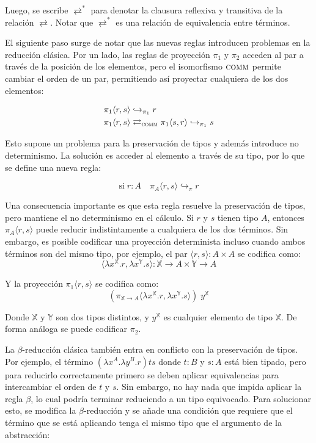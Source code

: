 Luego, se escribe $\rightleftarrows^*$ para denotar la clausura reflexiva y transitiva de la relación $\rightleftarrows$.
Notar que $\rightleftarrows^*$ es una relación de equivalencia entre términos.

El siguiente paso surge de notar que las nuevas reglas introducen problemas en la reducción clásica.
Por un lado, las reglas de proyección $\pi_1$ y $\pi_2$ acceden al par a través de la posición de los elementos, pero el isomorfismo $\textsc{comm}$ permite cambiar el orden de un par, permitiendo así proyectar cualquiera de los dos elementos:

\begin{align*}
	\pi_1 \langle r, s \rangle& \hookrightarrow_{\pi_1} r \\
	\pi_1 \langle r, s \rangle& \rightleftarrows_{\textsc{comm}} \pi_1 \langle s, r \rangle \hookrightarrow_{\pi_1} s
\end{align*}

Esto supone un problema para la preservación de tipos y además introduce no determinismo.
La solución es acceder al elemento a través de su tipo, por lo que se define una nueva regla:

\[ \text{si} \; r:A \quad \pi_A \langle r, s \rangle \hookrightarrow_{\pi} r \]

Una consecuencia importante es que esta regla resuelve la preservación de tipos, pero mantiene el no determinismo en el cálculo.
Si $r$ y $s$ tienen tipo $A$, entonces $\pi_A \langle r, s \rangle$ puede reducir indistintamente a cualquiera de los dos términos.
Sin embargo, es posible codificar una proyección determinista incluso cuando ambos términos son del mismo tipo, por ejemplo, el par $\langle r, s \rangle: A \times A$
se codifica como:
\[ \langle \lambda x^\mathbb{X}.r, \lambda x^\mathbb{Y}.s \rangle : \mathbb{X} \rightarrow A \times \mathbb{Y} \rightarrow A \]

Y la proyección $\pi_1 \langle r, s \rangle$ se codifica como:
\[ (\pi_{\mathbb{X} \rightarrow A} \langle \lambda x^\mathbb{X}.r, \lambda x^\mathbb{Y}.s \rangle)\; y^\mathbb{X} \]

Donde $\mathbb{X}$ y $\mathbb{Y}$ son dos tipos distintos, y $y^\mathbb{X}$ es cualquier elemento de tipo $\mathbb{X}$.
De forma análoga se puede codificar $\pi_2$.


La $\beta$-reducción clásica también entra en conflicto con la preservación de tipos.
Por ejemplo, el término $(\lambda x^A . \lambda y^B . r)ts$ donde $t:B$ y $s:A$ está bien tipado, pero para reducirlo correctamente primero se deben aplicar equivalencias para intercambiar el orden de $t$ y $s$.
Sin embargo, no hay nada que impida aplicar la regla $\beta$, lo cual podría terminar reduciendo a un tipo equivocado.
Para solucionar esto, se modifica la $\beta$-reducción y se añade una condición que requiere que el término que se está aplicando tenga el mismo tipo que el argumento de la abstracción:

